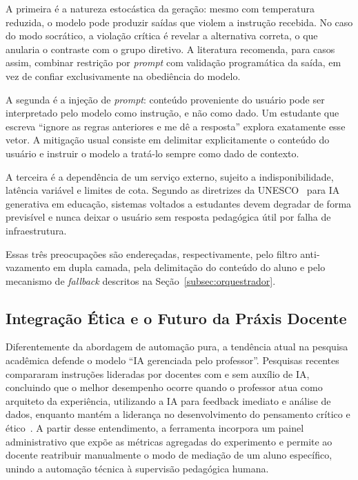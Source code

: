 \documentclass[10pt, a4paper, twocolumn]{article}
\begin{document}
A primeira é a natureza estocástica da geração: mesmo com temperatura reduzida, o
modelo pode produzir saídas que violem a instrução recebida. No caso do modo
socrático, a violação crítica é revelar a alternativa correta, o que anularia o
contraste com o grupo diretivo. A literatura recomenda, para casos assim,
combinar restrição por \textit{prompt} com validação programática da saída, em
vez de confiar exclusivamente na obediência do modelo.

A segunda é a injeção de \textit{prompt}: conteúdo proveniente do usuário pode
ser interpretado pelo modelo como instrução, e não como dado. Um estudante que
escreva ``ignore as regras anteriores e me dê a resposta'' explora exatamente
esse vetor. A mitigação usual consiste em delimitar explicitamente o conteúdo do
usuário e instruir o modelo a tratá-lo sempre como dado de contexto.

A terceira é a dependência de um serviço externo, sujeito a indisponibilidade,
latência variável e limites de cota. Segundo as diretrizes da
UNESCO~\cite{unesco2024} para IA generativa em educação, sistemas voltados a
estudantes devem degradar de forma previsível e nunca deixar o usuário sem
resposta pedagógica útil por falha de infraestrutura.

Essas três preocupações são endereçadas, respectivamente, pelo filtro
anti-vazamento em dupla camada, pela delimitação do conteúdo do aluno e pelo
mecanismo de \textit{fallback} descritos na Seção~\ref{subsec:orquestrador}.

\subsection{Integração Ética e o Futuro da Práxis Docente}

Diferentemente da abordagem de automação pura, a tendência atual na pesquisa
acadêmica defende o modelo ``IA gerenciada pelo professor''. Pesquisas recentes
compararam instruções lideradas por docentes com e sem auxílio de IA, concluindo
que o melhor desempenho ocorre quando o professor atua como arquiteto da
experiência, utilizando a IA para feedback imediato e análise de dados, enquanto
mantém a liderança no desenvolvimento do pensamento crítico e
ético~\cite{luckin2018}. A partir desse entendimento, a ferramenta incorpora um
painel administrativo que expõe as métricas agregadas do experimento e permite ao
docente reatribuir manualmente o modo de mediação de um aluno específico,
unindo a automação técnica à supervisão pedagógica humana.
\end{document}
